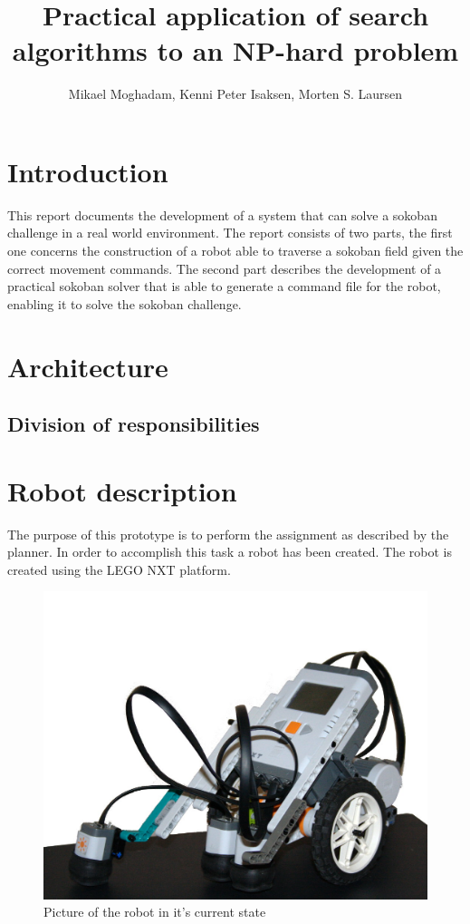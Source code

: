 \documentclass[draft, english, a4paper]{article}
\title{Practical application of search algorithms to an NP-hard problem}
\author{Mikael Moghadam, Kenni Peter Isaksen, Morten S. Laursen}
\begin{document}
\maketitle %


%
%
\newpage
\section{Introduction}
This report documents the development of a system that can solve a sokoban challenge in a real world environment. The report consists of two parts, the first one concerns the construction of a robot able to traverse a sokoban field given the correct movement commands. The second part describes the development of a practical sokoban solver that is able to generate a command file for the robot, enabling it to solve the sokoban challenge.
\newpage
\tableofcontents
\newpage
\section{Architecture}
	\subsection{Division of responsibilities}
	
\section{Robot description}
        The purpose of this prototype is to perform the assignment as described by
        the planner. In order to accomplish this task a robot 
        has been created. The robot is created using the LEGO NXT platform. 
        \begin{figure}[htp]
            \centering
    	    \includegraphics[scale=0.3]{robot2}
	        \caption{Picture of the robot in it's current state}\label{fig:robotPic}
        \end{figure} 
\end{document}
